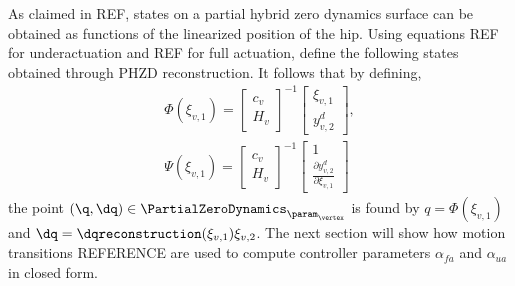 \label{sec:reconstruction} As claimed in REF, states on a partial hybrid zero dynamics surface can be obtained as functions of the linearized position of the hip. Using equations REF for underactuation and REF for full actuation, define the following states obtained through PHZD reconstruction. It follows that by defining,
\begin{align}
\Phi(\xi_{v,1}) = 
\begin{bmatrix}
c_{v} \\
H_{v}
\end{bmatrix}^{-1}
\begin{bmatrix}
\xi_{v,1} \\
y^{d}_{v,2}
\end{bmatrix}
, \\
\Psi(\xi_{v,1}) = 
\begin{bmatrix}
c_{v} \\
H_{v}
\end{bmatrix}^{-1}
\begin{bmatrix}
1 \\
\frac{\partial y^{d}_{v,2}}{\partial \xi_{v,1}}
\end{bmatrix} \nonumber
\end{align}
the point $(\q, \dq) \in \PartialZeroDynamics_{\param_{\vertex}}$ is found by $q  = \Phi(\xi_{v,1})$ and $\dq  = \dqreconstruction(\xi_{v,1})\xi_{v,2}$. The next section will show how motion transitions REFERENCE are used to compute controller parameters $\alpha_{fa}$ and $\alpha_{ua}$ in closed form.
\begin{comment}
Furthermore, this method can be used to compute states at \textit{any} value of $\xi_{1,\vertex}$;  in the proceeding sections we take advantage of this fact to specify values of $\xi_{1,\vertex}$ at 
which to transition from one domain to another. Let $\beta_1$ be a \textit{transition point} from 
the over actuated domain to the fully actuated domain, such that $(\qreconstruction(\beta_1)
,\dqreconstruction(\beta_1)) \in \guard_{oa \to fa}$ and likewise, let $\beta_2$ be a transition 
point from the fully actuated domain to the under actuated domain, such that $(\qreconstruction
(\beta_2),\dqreconstruction(\beta_2)) \in \guard_{fa \to ua}$.
\end{comment}

